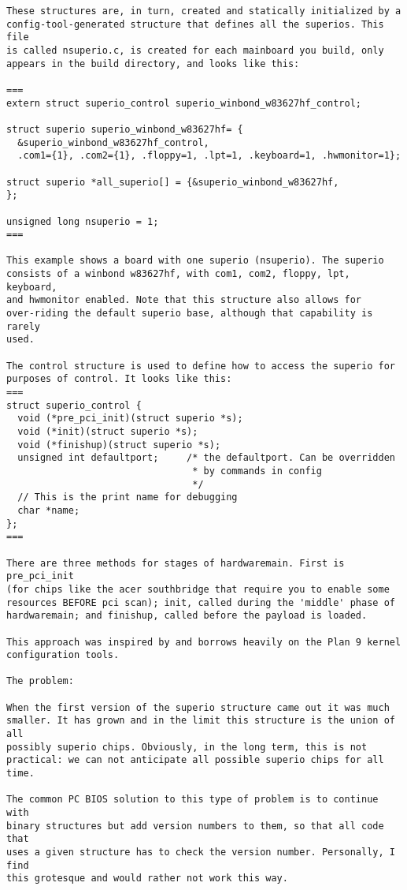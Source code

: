 \begin{verbatim}
These structures are, in turn, created and statically initialized by a
config-tool-generated structure that defines all the superios. This file
is called nsuperio.c, is created for each mainboard you build, only
appears in the build directory, and looks like this:

===
extern struct superio_control superio_winbond_w83627hf_control;

struct superio superio_winbond_w83627hf= {
  &superio_winbond_w83627hf_control,
  .com1={1}, .com2={1}, .floppy=1, .lpt=1, .keyboard=1, .hwmonitor=1};

struct superio *all_superio[] = {&superio_winbond_w83627hf,
};

unsigned long nsuperio = 1;
===

This example shows a board with one superio (nsuperio). The superio
consists of a winbond w83627hf, with com1, com2, floppy, lpt, keyboard,
and hwmonitor enabled. Note that this structure also allows for
over-riding the default superio base, although that capability is rarely
used.

The control structure is used to define how to access the superio for
purposes of control. It looks like this:
===
struct superio_control {
  void (*pre_pci_init)(struct superio *s);
  void (*init)(struct superio *s);
  void (*finishup)(struct superio *s);
  unsigned int defaultport;     /* the defaultport. Can be overridden
                                 * by commands in config
                                 */
  // This is the print name for debugging
  char *name;
};
===

There are three methods for stages of hardwaremain. First is pre_pci_init
(for chips like the acer southbridge that require you to enable some
resources BEFORE pci scan); init, called during the 'middle' phase of
hardwaremain; and finishup, called before the payload is loaded.

This approach was inspired by and borrows heavily on the Plan 9 kernel
configuration tools.

The problem:

When the first version of the superio structure came out it was much
smaller. It has grown and in the limit this structure is the union of all
possibly superio chips. Obviously, in the long term, this is not
practical: we can not anticipate all possible superio chips for all time.

The common PC BIOS solution to this type of problem is to continue with
binary structures but add version numbers to them, so that all code that
uses a given structure has to check the version number. Personally, I find
this grotesque and would rather not work this way.


\end{verbatim}
